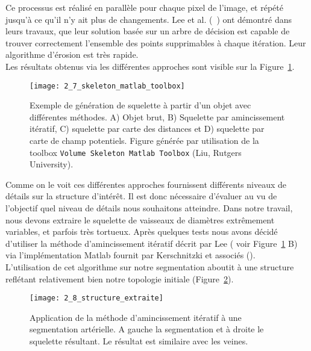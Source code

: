 Ce processus est réalisé en parallèle pour chaque pixel de l’image, et répété jusqu’à ce qu’il n’y ait plus de changements. Lee et al. (~\cite{Lee1994}) ont démontré dans leurs travaux, que leur solution basée sur un arbre de décision est capable de trouver correctement l’ensemble des points supprimables à chaque itération. Leur algorithme d’érosion est très rapide.\\
Les résultats obtenus via les différentes approches sont visible sur la Figure~\ref{fig:2_7_skeleton_matlab_toolbox}. 
\begin{figure}[!t]
\centering
\texttt{[image: 2\_7\_skeleton\_matlab\_toolbox]}
\caption{Exemple de génération de squelette à partir d'un objet avec différentes méthodes. A) Objet brut, B) Squelette par amincissement itératif, C) squelette par carte des distances et D) squelette par carte de champ potentiels. Figure générée par utilisation de la toolbox {\tt Volume Skeleton Matlab Toolbox} (Liu, Rutgers University).}
\label{fig:2_7_skeleton_matlab_toolbox}	
\end{figure}	
Comme on le voit ces différentes approches fournissent différents niveaux de détails sur la structure d’intérêt. Il est donc nécessaire d’évaluer au vu de l’objectif quel niveau de détails nous souhaitons atteindre. Dans notre travail, nous devons extraire le squelette de vaisseaux de diamètres extrêmement variables, et parfois très tortueux. Après quelques tests nous avons décidé d’utiliser la méthode d’amincissement itératif décrit par Lee (\cite{Lee1994} voir Figure~\ref{fig:2_7_skeleton_matlab_toolbox} B) via l’implémentation Matlab fournit par Kerschnitzki et associés (\cite{Kerschnitzki2013}).\\
L’utilisation de cet algorithme sur notre segmentation aboutit à une structure reflétant relativement bien notre topologie initiale (Figure~\ref{fig:2_8_structure_extraite}).
\begin{figure}[!t]
\centering
\texttt{[image: 2\_8\_structure\_extraite]}
\caption{Application de la méthode d'amincissement itératif à une segmentation artérielle. A gauche la segmentation et à droite le squelette résultant. Le résultat est similaire avec les veines.}
\label{fig:2_8_structure_extraite}	
\end{figure}	
